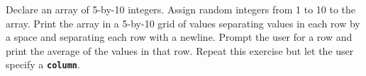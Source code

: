 \begin{ex}
Declare an array of 5-by-10 integers. Assign random integers from 1 to 10 to the array. Print the array in a 5-by-10 grid of values separating values in each row by a space and separating each row with a newline. Prompt the user for a row and print the average of the values in that row. Repeat this exercise but let the user specify a
\texttt{\textbf{column}}.
\end{ex}
